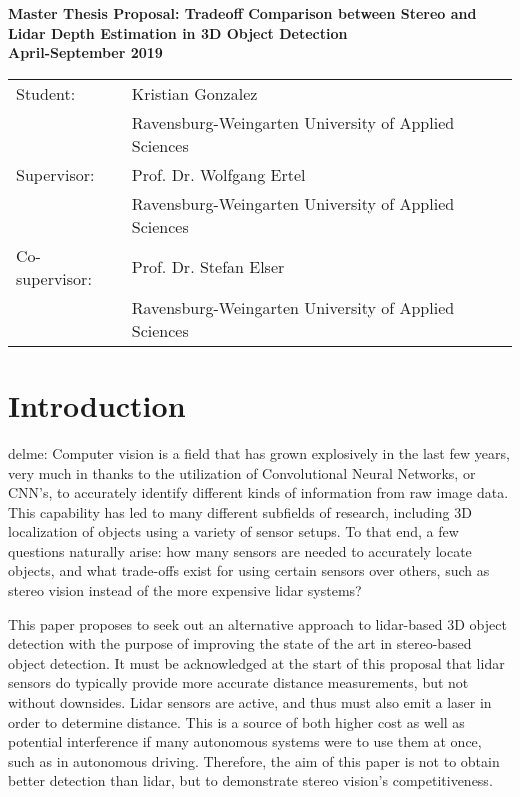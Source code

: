 \begin{center}
    \large
    \textbf{Master Thesis Proposal: Tradeoff Comparison between Stereo and Lidar Depth Estimation in 3D Object Detection}\\
    \noindent \textbf{April-September 2019}\\
    \normalsize 
\end{center}

\begin{tabular}{ll}
    Student: & Kristian Gonzalez \\
    & Ravensburg-Weingarten University of Applied Sciences\\
    Supervisor: & Prof. Dr. Wolfgang Ertel \\
    & Ravensburg-Weingarten University of Applied Sciences\\
    Co-supervisor: & Prof. Dr. Stefan Elser\\
    & Ravensburg-Weingarten University of Applied Sciences\\
\end{tabular}

\section{Introduction}
delme:
Computer vision is a field that has grown explosively in the last few years, very much in thanks to the utilization of Convolutional Neural Networks, or CNN's, to accurately identify different kinds of information from raw image data. This capability has led to many different subfields of research, including 3D localization of objects using a variety of sensor setups. To that end, a few questions naturally arise: how many sensors are needed to accurately locate objects, and what trade-offs exist for using certain sensors over others, such as stereo vision instead of the more expensive lidar systems? 

This paper proposes to seek out an alternative approach to lidar-based 3D object detection with the purpose of improving the state of the art in stereo-based object detection. It must be acknowledged at the start of this proposal that lidar sensors do typically provide more accurate distance measurements, but not without downsides. Lidar sensors are active, and thus must also emit a laser in order to determine distance. This is a source of both higher cost as well as potential interference if many autonomous systems were to use them at once, such as in autonomous driving. Therefore, the aim of this paper is not to obtain better detection than lidar, but to demonstrate stereo vision's competitiveness. 


